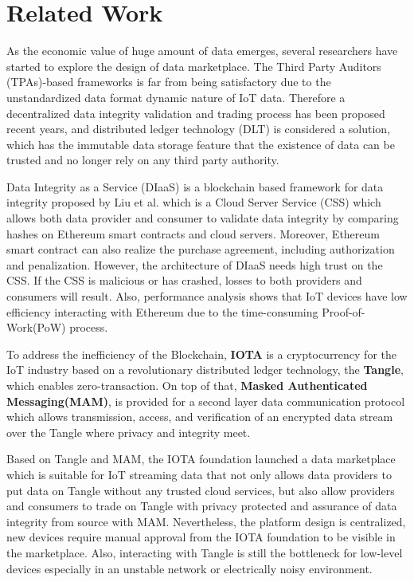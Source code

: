 \documentclass[journal,10pt,a4paper]{IEEEtran}
\begin{document}
\section{\normalsize\textbf{Related Work}}
As the economic value of huge amount of data emerges, several researchers have started to explore the design of data marketplace. The Third Party Auditors (TPAs)-based frameworks\cite{TPA} is far from being satisfactory due to the unstandardized data format dynamic nature of IoT data. Therefore a decentralized data integrity validation and trading process has been proposed recent years, and distributed ledger technology (DLT) is considered a solution, which has the immutable data storage feature that the existence of data can be trusted and no longer rely on any third party authority.

Data Integrity as a Service (DIaaS) is a blockchain based framework for data integrity proposed by Liu et al.\cite{DIaas} which is a Cloud Server Service (CSS) which allows both data provider and consumer to validate data integrity by comparing hashes on Ethereum smart contracts\cite{smartContract} and cloud servers. Moreover, Ethereum smart contract can also realize the purchase agreement, including authorization and penalization. However, the architecture of DIaaS needs high trust on the CSS. If the CSS is malicious or has crashed, losses to both providers and consumers will result. Also, performance analysis shows that IoT devices have low efficiency interacting with Ethereum due to the time-consuming Proof-of-Work(PoW) process.

To address the inefficiency of the Blockchain, \textbf{IOTA}\cite{IOTAwhitepaper} is a cryptocurrency for the IoT industry based on a revolutionary distributed ledger technology, the \textbf{Tangle}, which enables zero-transaction. On top of that, \textbf{Masked Authenticated Messaging(MAM)}\cite{MAM}, is provided for a second layer data communication protocol which allows transmission, access, and verification of an encrypted data stream over the Tangle where privacy and integrity meet.

Based on Tangle and MAM, the IOTA foundation launched a data marketplace\cite{IOTADataMarket} which is suitable for IoT streaming data that not only allows data providers to put data on Tangle without any trusted cloud services, but also allow providers and consumers to trade on Tangle with privacy protected and assurance of data integrity from source with MAM. Nevertheless, the platform design is centralized, new devices require manual approval from the IOTA foundation to be visible in the marketplace. Also, interacting with Tangle is still the bottleneck for low-level devices especially in an unstable network or electrically noisy environment.
\end{document}
